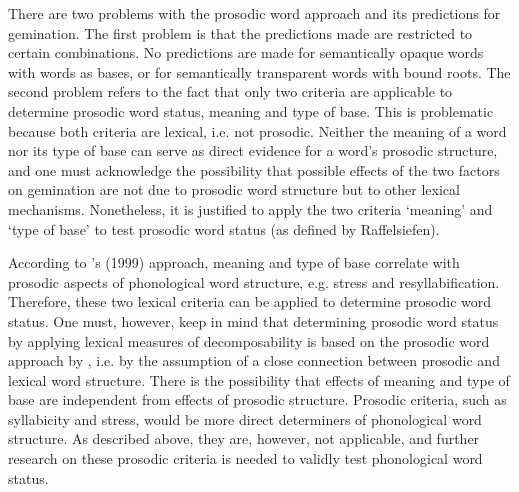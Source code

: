 There are two problems with the prosodic word approach and its predictions for gemination. 
The first problem is that the predictions made are restricted to certain combinations. No predictions are made for semantically opaque words with words as bases, or for semantically transparent words with bound roots. 
The second problem refers to the fact that only two criteria are applicable to determine prosodic word status, meaning and type of base. This is problematic because both criteria are lexical, i.e. not prosodic. Neither the meaning of a word nor its type of base can serve as direct evidence for a word's prosodic structure, and one must acknowledge the possibility that possible effects of the two factors on gemination are not due to prosodic word structure but to other lexical mechanisms. 
Nonetheless, it is justified to apply the two criteria `meaning' and `type of base' to test prosodic word status (as defined by Raffelsiefen). 

According to  \citeauthor{Raffelsiefen.1999}'s (1999) approach, meaning and type of base correlate with prosodic aspects of phonological word structure, e.g. stress and resyllabification. Therefore, these two lexical criteria can be applied to determine prosodic word status. 
One must, however, keep in mind that determining prosodic word status by applying lexical measures of decomposability is based on the prosodic word approach by \cite{Raffelsiefen.1999}, i.e. by the assumption of a close connection between prosodic and lexical word structure. There is the possibility that effects of meaning and type of base are independent from effects of prosodic structure. Prosodic criteria, such as syllabicity and stress, would be more direct determiners of phonological word structure. As described above, they are, however, not applicable, and further research on these prosodic criteria is needed to validly test phonological word status. 


